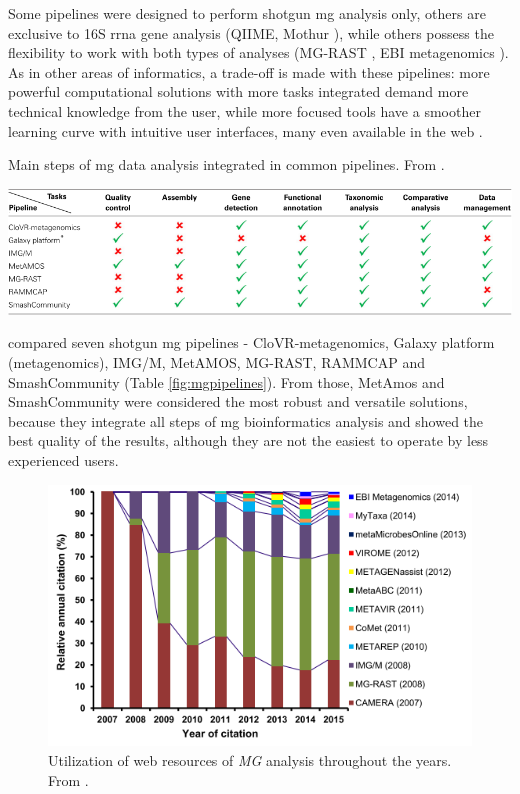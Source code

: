 \documentclass[
  oneside,
  11pt, a4paper,
  footinclude=true,
  headinclude=true,
  cleardoublepage=empty
]{scrbook}
\begin{document}
    Some pipelines were designed to perform shotgun \gls{mg} analysis only, others are exclusive to 16S \gls{rrna} gene analysis (QIIME, Mothur \citep{Plummer2015}), while others possess the flexibility to work with both types of analyses (MG-RAST \citep{Wilke2016}, EBI metagenomics \citep{Hunter2014}). As in other areas of informatics, a trade-off is made with these pipelines: more powerful computational solutions with more tasks integrated demand more technical knowledge from the user, while more focused tools have a smoother learning curve with intuitive user interfaces, many even available in the web \citep{Ladoukakis2014, Oulas2015}. 
    
    \begin{table}[h]
    \caption{Main steps of \gls{mg} data analysis integrated in common pipelines. From \citep{Ladoukakis2014}.}
    \includegraphics[width=\columnwidth]{MGs_pipelines_comparison.png}
    \label{fig:mgpipelines}
    \end{table}
    
    \cite{Ladoukakis2014} compared seven shotgun \gls{mg} pipelines - CloVR-metagenomics, Galaxy platform (metagenomics), IMG/M, MetAMOS, MG-RAST, RAMMCAP and SmashCommunity (Table \ref{fig:mgpipelines}). From those, MetAmos and SmashCommunity  were considered the most robust and versatile solutions, because they integrate all steps of \gls{mg} bioinformatics analysis and showed the best quality of the results, although they are not the easiest to operate by less experienced users. 
    
    \begin{figure}[h]
    \includegraphics[width=\columnwidth]{webMGpipelines.png}
    \caption{Utilization of web resources of \textit{MG} analysis throughout the years. From \cite{Dudhagara2015}.}
    \label{fig:webmgpipelines}
    \end{figure}
    
\end{document}
